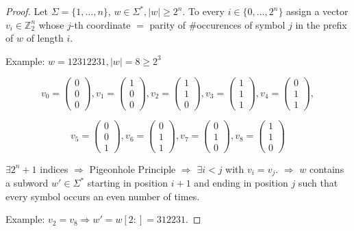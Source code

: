 \documentclass[12pt]{article}
\theoremstyle{plain} %
\newcommand{\Z}{\mathbb{Z}} %
\newcommand{\set}[1]{\{#1\}}
\begin{document}
\begin{proof}
Let \(\Sigma = \set{1, \ldots, n}\), \(w \in \Sigma^*, |w| \geq 2^n\). To every \(i \in \set{0, \ldots, 2^n}\) 
assign a vector \(v_i \in \Z_2^n\) whose \(j\)-th coordinate \(=\) parity of \#occurences of symbol \(j\) in the 
prefix of \(w\) of length \(i\).

Example:
\(w = 12312231, |w| = 8 \geq 2^3\)

\[ v_0 = \begin{pmatrix}
0 \\ 0 \\ 0
\end{pmatrix}, v_1 = \begin{pmatrix}
1 \\ 0 \\ 0
\end{pmatrix}, v_2 = \begin{pmatrix}
1 \\ 1 \\ 0
\end{pmatrix}, v_3 = \begin{pmatrix}
1 \\ 1 \\ 1
\end{pmatrix}, v_4 = \begin{pmatrix}
0 \\ 1 \\ 1
\end{pmatrix}, \]

\[ v_5 = \begin{pmatrix}
0 \\ 0 \\ 1
\end{pmatrix}, v_6 = \begin{pmatrix}
0 \\ 1 \\ 1
\end{pmatrix}, v_7 = \begin{pmatrix}
0 \\ 1 \\ 0
\end{pmatrix}, v_8 = \begin{pmatrix}
1 \\ 1 \\ 0
\end{pmatrix} \]

\(\exists 2^n + 1\) indices \(\Rightarrow\) Pigeonhole Principle \(\Rightarrow\)
\(\exists i < j\) with \(v_i = v_j\). \(\Rightarrow\) \(w\) contains a subword \(w' \in \Sigma^*\)
starting in position \(i + 1\) and ending in position \(j\) such that every symbol occurs an even number of times.

Example: \(v_2 = v_8 \Rightarrow w' = w[2:] = 312231\).
\end{proof}
\end{document}
